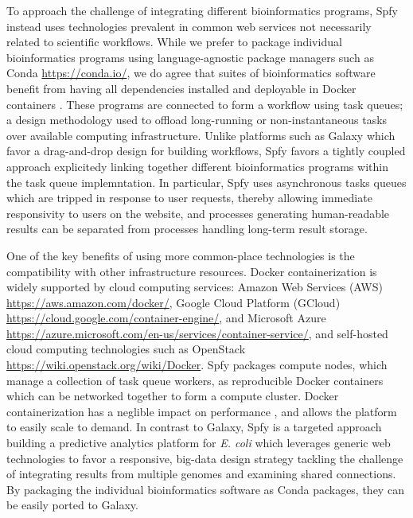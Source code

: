 \documentclass[a4,center,fleqn]{NAR}
\begin{document}
To approach the challenge of integrating different bioinformatics programs, Spfy instead uses technologies prevalent in common web services not necessarily related to scientific workflows.
While we prefer to package individual bioinformatics programs using language-agnostic package managers such as Conda \url{https://conda.io/}, we do agree that suites of bioinformatics software benefit from having all dependencies installed and deployable in Docker containers \cite{di2015impact}.
These programs are connected to form a workflow using task queues; a design methodology used to offload long-running or non-instantaneous tasks over available computing infrastructure.
Unlike platforms such as Galaxy which favor a drag-and-drop design for building workflows, Spfy favors a tightly coupled approach explicitedy linking together different bioinformatics programs within the task queue implemntation.
In particular, Spfy uses asynchronous tasks queues which are tripped in response to user requests, thereby allowing immediate responsivity to users on the website, and processes generating human-readable results can be separated from processes handling long-term result storage.

One of the key benefits of using more common-place technologies is the compatibility with other infrastructure resources.
Docker containerization is widely supported by cloud computing services: Amazon Web Services (AWS) \url{https://aws.amazon.com/docker/}, Google Cloud Platform (GCloud) \url{https://cloud.google.com/container-engine/}, and Microsoft Azure \url{https://azure.microsoft.com/en-us/services/container-service/}, and self-hosted cloud computing technologies such as OpenStack \url{https://wiki.openstack.org/wiki/Docker}.
Spfy packages compute nodes, which manage a collection of task queue workers, as reproducible Docker containers which can be networked together to form a compute cluster.
Docker containerization has a neglible impact on performance \cite{di2015impact}, and allows the platform to easily scale to demand.
In contrast to Galaxy, Spfy is a targeted approach building a predictive analytics platform for \textit{E. coli} which leverages generic web technologies to favor a responsive, big-data design strategy tackling the challenge \cite{fricke2014bacterial} of integrating results from multiple genomes and examining shared connections.
By packaging the individual bioinformatics software as Conda packages, they can be easily ported to Galaxy.
\end{document}
